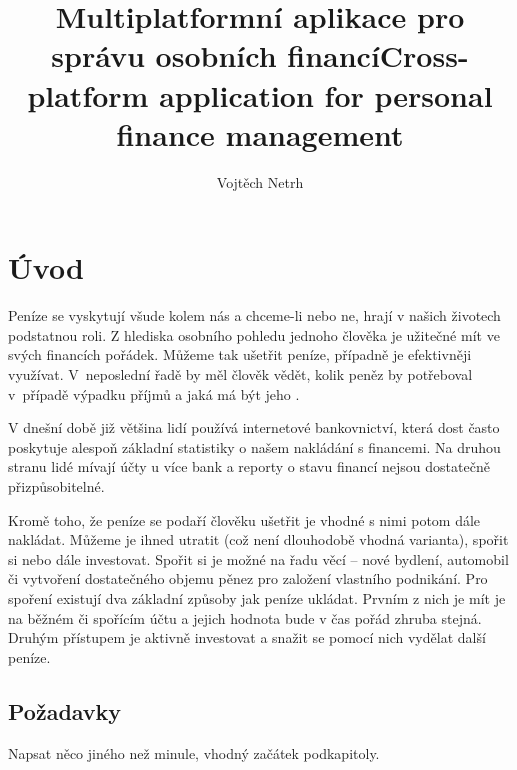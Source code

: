 \documentclass[
  biblatex,
  figures=true,
  tables=false,
  glossaries,
  index
]{kidiplom}
\title{Multiplatformní aplikace pro správu osobních financí}
\title[english]{Cross-platform application for personal finance management}
\author{Vojtěch Netrh}
\begin{document}
\maketitle



\newcommand{\BibLaTeX}{\textsc{Bib}\LaTeX}


\section{Úvod}
Peníze se vyskytují všude kolem nás a chceme-li nebo ne, hrají v našich životech podstatnou roli. Z hlediska osobního pohledu jednoho člověka je užitečné mít ve svých financích pořádek. Můžeme tak ušetřit peníze, případně je efektivněji využívat. V~neposlední řadě by měl člověk vědět, kolik peněz by potřeboval v~případě výpadku příjmů a jaká má být jeho .

V dnešní době již většina lidí používá internetové bankovnictví, která dost často poskytuje alespoň základní statistiky o našem nakládání s financemi. Na druhou stranu lidé mívají účty u více bank a reporty o stavu financí nejsou dostatečně přizpůsobitelné.

Kromě toho, že peníze se podaří člověku ušetřit je vhodné s nimi potom dále nakládat. Můžeme je ihned utratit (což není dlouhodobě vhodná varianta), spořit si nebo dále investovat. Spořit si je možné na řadu věcí -- nové bydlení, automobil či vytvoření dostatečného objemu pěnez pro založení vlastního podnikání. Pro spoření existují dva základní způsoby jak peníze ukládat. Prvním z nich je mít je na běžném či spořícím účtu a jejich hodnota bude v čas pořád zhruba stejná. Druhým přístupem je aktivně investovat a snažit se pomocí nich vydělat další peníze.

\subsection{Požadavky}
Napsat něco jiného než minule, vhodný začátek podkapitoly.
\end{document}

